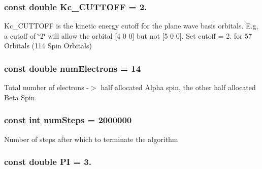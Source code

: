 \hypertarget{UEG__MAIN__binarytest_8C_aa8c8c523b8aaaef95263171d9b078d8d}{
\subsubsection[{Kc\-\_\-\-C\-U\-T\-T\-O\-F\-F}]{\setlength{\rightskip}{0pt plus 5cm}const double Kc\-\_\-\-C\-U\-T\-T\-O\-F\-F = 2.}}\label{UEG__MAIN__binarytest_8C_aa8c8c523b8aaaef95263171d9b078d8d}
Kc\-\_\-\-C\-U\-T\-T\-O\-F\-F is the kinetic energy cutoff for the plane wave basis orbitals. E.\-g, a cutoff of \char`\"{}2\char`\"{} will allow the orbital \mbox{[}4 0 0\mbox{]} but not \mbox{[}5 0 0\mbox{]}. Set cutoff = 2. for 57 Orbitals (114 Spin Orbitals) \hypertarget{UEG__MAIN__binarytest_8C_a613e167ad809e33c73b70a24822cc6f9}{
\subsubsection[{num\-Electrons}]{\setlength{\rightskip}{0pt plus 5cm}const double num\-Electrons = 14}}\label{UEG__MAIN__binarytest_8C_a613e167ad809e33c73b70a24822cc6f9}
Total number of electrons -\/$>$ half allocated Alpha spin, the other half allocated Beta Spin. \hypertarget{UEG__MAIN__binarytest_8C_a957840dbdbfa8a29c76754be143dd02f}{
\subsubsection[{num\-Steps}]{\setlength{\rightskip}{0pt plus 5cm}const int num\-Steps = 2000000}}\label{UEG__MAIN__binarytest_8C_a957840dbdbfa8a29c76754be143dd02f}
Number of steps after which to terminate the algorithm \hypertarget{UEG__MAIN__binarytest_8C_a952eac791b596a61bba0a133a3bb439f}{
\subsubsection[{P\-I}]{\setlength{\rightskip}{0pt plus 5cm}const double P\-I = 3.}}\label{UEG__MAIN__binarytest_8C_a952eac791b596a61bba0a133a3bb439f}
